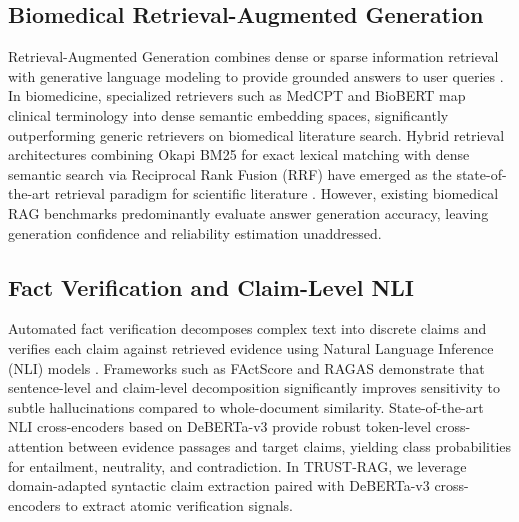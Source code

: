\documentclass[journal,10pt]{IEEEtran}
\begin{document}
\subsection{Biomedical Retrieval-Augmented Generation}
Retrieval-Augmented Generation combines dense or sparse information retrieval with generative language modeling to provide grounded answers to user queries \cite{lewis2020retrieval, izacard2021leveraging}. In biomedicine, specialized retrievers such as MedCPT \cite{jin2023medcpt} and BioBERT \cite{lee2020biobert} map clinical terminology into dense semantic embedding spaces, significantly outperforming generic retrievers on biomedical literature search. Hybrid retrieval architectures combining Okapi BM25 \cite{robertson2009probabilistic} for exact lexical matching with dense semantic search via Reciprocal Rank Fusion (RRF) \cite{cormack2009reciprocal} have emerged as the state-of-the-art retrieval paradigm for scientific literature \cite{gao2023precise}. However, existing biomedical RAG benchmarks predominantly evaluate answer generation accuracy, leaving generation confidence and reliability estimation unaddressed.

\subsection{Fact Verification and Claim-Level NLI}
Automated fact verification decomposes complex text into discrete claims and verifies each claim against retrieved evidence using Natural Language Inference (NLI) models \cite{thorne2018fever, wadden2020fact}. Frameworks such as FActScore \cite{min2023factscore} and RAGAS \cite{es2023ragas} demonstrate that sentence-level and claim-level decomposition significantly improves sensitivity to subtle hallucinations compared to whole-document similarity. State-of-the-art NLI cross-encoders based on DeBERTa-v3 \cite{he2021debertav3} provide robust token-level cross-attention between evidence passages and target claims, yielding class probabilities for entailment, neutrality, and contradiction. In TRUST-RAG, we leverage domain-adapted syntactic claim extraction paired with DeBERTa-v3 cross-encoders to extract atomic verification signals.
\end{document}
